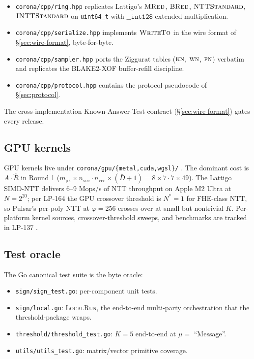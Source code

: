 \begin{itemize}
\item \texttt{corona/cpp/ring.hpp} replicates Lattigo's $\textsc{MRed}$, $\textsc{BRed}$, $\textsc{NTTStandard}$, $\textsc{INTTStandard}$ on \texttt{uint64\_t} with $\texttt{\_\_int128}$ extended multiplication.
\item \texttt{corona/cpp/serialize.hpp} implements $\textsc{WriteTo}$ in the wire format of \S\ref{sec:wire-format}, byte-for-byte.
\item \texttt{corona/cpp/sampler.hpp} ports the Ziggurat tables ($\textsc{kn}$, $\textsc{wn}$, $\textsc{fn}$) verbatim and replicates the BLAKE2-XOF buffer-refill discipline.
\item \texttt{corona/cpp/protocol.hpp} contains the protocol pseudocode of \S\ref{sec:protocol}.
\end{itemize}

The cross-implementation Known-Answer-Test contract (\S\ref{sec:wire-format}) gates every release.

\subsection{GPU kernels}

GPU kernels live under \texttt{corona/gpu/\{metal,cuda,wgsl\}/} \cite{lp137}. The dominant cost is $A \cdot \hat R$ in Round 1 ($m_{\textrm{pk}} \times n_{\textrm{vec}} \cdot n_{\textrm{vec}} \times (\bar D + 1) = 8 \times 7 \cdot 7 \times 49$). The Lattigo SIMD-NTT \cite{lattigov7} delivers 6--9 Mops/s of NTT throughput on Apple M2 Ultra at $N = 2^{20}$; per LP-164 \cite{lp164} the GPU crossover threshold is $N^* = 1$ for FHE-class NTT, so Pulsar's per-poly NTT at $\varphi = 256$ crosses over at small but nontrivial $K$. Per-platform kernel sources, crossover-threshold sweeps, and benchmarks are tracked in LP-137 \cite{lp137}.

\subsection{Test oracle}

The Go canonical test suite is the byte oracle:

\begin{itemize}
\item \texttt{sign/sign\_test.go}: per-component unit tests.
\item \texttt{sign/local.go}: \textsc{LocalRun}, the end-to-end multi-party orchestration that the threshold-package \cite{pulsar} wraps.
\item \texttt{threshold/threshold\_test.go}: $K = 5$ end-to-end at $\mu = $ ``Message''.
\item \texttt{utils/utils\_test.go}: matrix/vector primitive coverage.
\end{itemize}

